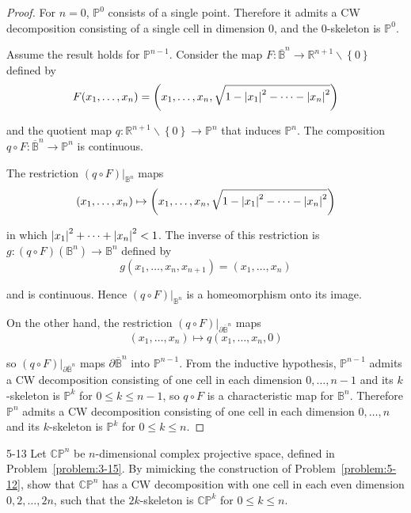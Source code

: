 \begin{proof}
	For \( n = 0 \), \( \mathbb{P}^{0} \) consists of a single point. Therefore it admits a CW decomposition consisting of a single cell in dimension 0, and the 0-skeleton is \( \mathbb{P}^{0} \).

	Assume the result holds for \( \mathbb{P}^{n-1} \). Consider the map \( F: \overline{\mathbb{B}}^{n} \to \mathbb{R}^{n+1} \smallsetminus \left\{0\right\} \) defined by
	\[
		F(x_{1}, \ldots, x_{n}) = \left(x_{1}, \dots, x_{n}, \sqrt{1 - \left\vert{x_{1}}\right\vert^{2} - \cdots - \left\vert{x_{n}}\right\vert^{2}} \right)
	\]

	and the quotient map \( q: \mathbb{R}^{n+1}\smallsetminus\left\{0\right\} \to \mathbb{P}^{n} \) that induces \( \mathbb{P}^{n} \). The composition \( q\circ F: \overline{\mathbb{B}}^{n} \to \mathbb{P}^{n} \) is continuous.

	The restriction \( (q\circ F)\vert_{\mathbb{B}^{n}} \) maps
	\[
		(x_{1}, \ldots, x_{n}) \mapsto \left(x_{1}, \dots, x_{n}, \sqrt{1 - \left\vert{x_{1}}\right\vert^{2} - \cdots - \left\vert{x_{n}}\right\vert^{2}} \right)
	\]

	in which \( \left\vert{x_{1}}\right\vert^{2} + \cdots + \left\vert{x_{n}}\right\vert^{2} < 1 \). The inverse of this restriction is \( g: (q\circ F)(\mathbb{B}^{n}) \to \mathbb{B}^{n} \) defined by
	\[
		g(x_{1}, \ldots, x_{n}, x_{n+1}) = (x_{1}, \ldots, x_{n})
	\]

	and is continuous. Hence \( (q\circ F)\vert_{\mathbb{B}^{n}} \) is a homeomorphism onto its image.

	On the other hand, the restriction \( (q\circ F)\vert_{\partial\overline{\mathbb{B}}^{n}} \) maps
	\[
		(x_{1}, \ldots, x_{n}) \mapsto q(x_{1}, \ldots, x_{n}, 0)
	\]

	so \( (q\circ F)\vert_{\partial\overline{\mathbb{B}}^{n}} \) maps \( \partial\overline{\mathbb{B}}^{n} \) into \( \mathbb{P}^{n-1} \). From the inductive hypothesis, \( \mathbb{P}^{n-1} \) admits a CW decomposition consisting of one cell in each dimension \( 0, \ldots, n-1 \) and its \( k \)-skeleton is \( \mathbb{P}^{k} \) for \( 0 \leq k \leq n-1 \), so \( q\circ F \) is a characteristic map for \( \mathbb{B}^{n} \). Therefore \( \mathbb{P}^{n} \) admits a CW decomposition consisting of one cell in each dimension \( 0, \ldots, n \) and its \( k \)-skeleton is \( \mathbb{P}^{k} \) for \( 0 \leq k \leq n \).
\end{proof}

\begin{problem}{5-13}\label{problem:5-13}
Let \( \mathbb{CP}^{n} \) be \( n \)-dimensional complex projective space, defined in Problem~\ref{problem:3-15}. By mimicking the construction of Problem~\ref{problem:5-12}, show that \( \mathbb{CP}^{n} \) has a CW decomposition with one cell in each even dimension \( 0, 2, \dots, 2n \), such that the \( 2k \)-skeleton is \( \mathbb{CP}^{k} \) for \( 0 \le k \le n \).
\end{problem}

